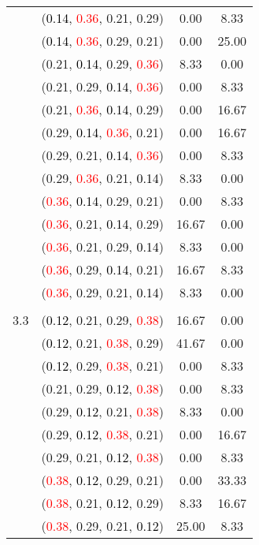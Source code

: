 \documentclass[10pt,a4paper]{report}
\begin{document}
\begin{center}
\begin{longtable}{clcc}
			&(\textcolor{black}{0.14}, \textcolor{red}{0.36}, 0.21, 0.29)&0.00&8.33\\
			&(\textcolor{black}{0.14}, \textcolor{red}{0.36}, 0.29, 0.21)&0.00&25.00\\
			&(0.21, \textcolor{black}{0.14}, 0.29, \textcolor{red}{0.36})&8.33&0.00\\
			&(0.21, 0.29, \textcolor{black}{0.14}, \textcolor{red}{0.36})&0.00&8.33\\
			&(0.21, \textcolor{red}{0.36}, \textcolor{black}{0.14}, 0.29)&0.00&16.67\\
			&(0.29, \textcolor{black}{0.14}, \textcolor{red}{0.36}, 0.21)&0.00&16.67\\
			&(0.29, 0.21, \textcolor{black}{0.14}, \textcolor{red}{0.36})&0.00&8.33\\
			&(0.29, \textcolor{red}{0.36}, 0.21, \textcolor{black}{0.14})&8.33&0.00\\
			&(\textcolor{red}{0.36}, \textcolor{black}{0.14}, 0.29, 0.21)&0.00&8.33\\
			&(\textcolor{red}{0.36}, 0.21, \textcolor{black}{0.14}, 0.29)&16.67&0.00\\
			&(\textcolor{red}{0.36}, 0.21, 0.29, \textcolor{black}{0.14})&8.33&0.00\\
			&(\textcolor{red}{0.36}, 0.29, \textcolor{black}{0.14}, 0.21)&16.67&8.33\\
			&(\textcolor{red}{0.36}, 0.29, 0.21, \textcolor{black}{0.14})&8.33&0.00\\
		&&&\\
		3.3			&(\textcolor{black}{0.12}, 0.21, 0.29, \textcolor{red}{0.38})&16.67&0.00\\
			&(\textcolor{black}{0.12}, 0.21, \textcolor{red}{0.38}, 0.29)&41.67&0.00\\
			&(\textcolor{black}{0.12}, 0.29, \textcolor{red}{0.38}, 0.21)&0.00&8.33\\
			&(0.21, 0.29, \textcolor{black}{0.12}, \textcolor{red}{0.38})&0.00&8.33\\
			&(0.29, \textcolor{black}{0.12}, 0.21, \textcolor{red}{0.38})&8.33&0.00\\
			&(0.29, \textcolor{black}{0.12}, \textcolor{red}{0.38}, 0.21)&0.00&16.67\\
			&(0.29, 0.21, \textcolor{black}{0.12}, \textcolor{red}{0.38})&0.00&8.33\\
			&(\textcolor{red}{0.38}, \textcolor{black}{0.12}, 0.29, 0.21)&0.00&33.33\\
			&(\textcolor{red}{0.38}, 0.21, \textcolor{black}{0.12}, 0.29)&8.33&16.67\\
			&(\textcolor{red}{0.38}, 0.29, 0.21, \textcolor{black}{0.12})&25.00&8.33\\
		\bottomrule
	\end{longtable}
\end{center}
\end{document}
